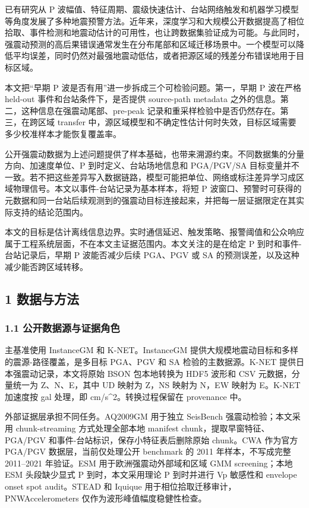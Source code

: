 \documentclass[
  11pt,
]{ctexart}
\begin{document}
已有研究从 P
波幅值、特征周期、震级快速估计、台站网络触发和机器学习模型等角度发展了多种地震预警方法。近年来，深度学习和大规模公开数据提高了相位拾取、事件检测和地震动估计的可用性，也让跨数据集验证成为可能。与此同时，强震动预测的高后果错误通常发生在分布尾部和区域迁移场景中。一个模型可以降低平均误差，同时仍然对最强地震动低估，或者把源区域的残差分布错误地用于目标区域。

本文把``早期 P 波是否有用''进一步拆成三个可检验问题。第一，早期 P
波在严格 held-out 事件和台站条件下，是否提供 source-path metadata
之外的信息。第二，这种信息在强震动尾部、pre-peak
记录和重采样检验中是否仍然存在。第三，在跨区域 transfer
中，源区域模型和不确定性估计何时失效，目标区域需要多少校准样本才能恢复覆盖率。

公开强震动数据为上述问题提供了样本基础，也带来溯源约束。不同数据集的分量方向、加速度单位、P
到时定义、台站场地信息和 PGA/PGV/SA
目标变量并不一致。若不把这些差异写入数据链路，模型可能把单位、网络或标注差异学习成区域物理信号。本文以事件-台站记录为基本样本，将短
P
波窗口、预警时可获得的元数据和同一台站后续观测到的强震动目标连接起来，并把每一层证据限定在其实际支持的结论范围内。

本文的目标是估计离线信息边界。实时通信延迟、触发策略、报警阈值和公众响应属于工程系统层面，不在本文主证据范围内。本文关注的是在给定
P 到时和事件-台站记录后，早期 P 波能否减少后续 PGA、PGV 或 SA
的预测误差，以及这种减少能否跨区域转移。

\subsection{1 数据与方法}\label{ux6570ux636eux4e0eux65b9ux6cd5}

\subsubsection{1.1
公开数据源与证据角色}\label{ux516cux5f00ux6570ux636eux6e90ux4e0eux8bc1ux636eux89d2ux8272}

主基准使用 InstanceGM 和 K-NET。InstanceGM
提供大规模地震动目标和多样的震源-路径覆盖，是多目标 PGA、PGV 和 SA
检验的主数据源。K-NET 提供日本强震动记录，本文将原始 BSON 包本地转换为
HDF5 波形和 CSV 元数据，分量统一为 Z、N、E，其中 UD 映射为 Z，NS 映射为
N，EW 映射为 E。K-NET 加速度按 gal 处理，即 cm/s\^{}2。转换过程保留在
provenance 中。

外部证据层承担不同任务。AQ2009GM 用于独立 SeisBench 强震动检验；本文采用
chunk-streaming 方式处理全部本地 manifest chunk，提取早窗特征、PGA/PGV
和事件-台站标识，保存小特征表后删除原始 chunk。CWA 作为官方 PGA/PGV
数据层，当前仅处理公开 benchmark 的 2011 年样本，不写成完整 2011--2021
年验证。ESM 用于欧洲强震动外部域和区域 GMM screening；本地 ESM
头段缺少显式 P 到时，本文采用理论 P 到时并进行 Vp 敏感性和 envelope
onset spot audit。STEAD 和 Iquique
用于相位拾取迁移审计，PNWAccelerometers 仅作为波形峰值幅度稳健性检查。
\end{document}
